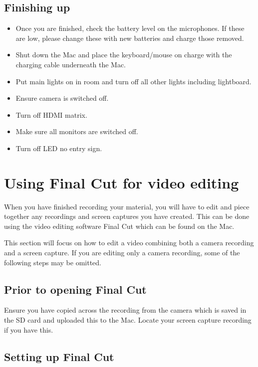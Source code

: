 \documentclass[
]{book}
\begin{document}
\hypertarget{finishing-up}{%
\section{Finishing up}\label{finishing-up}}

\begin{itemize}
\item
  Once you are finished, check the battery level on the microphones. If these are low, please change these with new batteries and charge those removed.
\item
  Shut down the Mac and place the keyboard/mouse on charge with the charging cable underneath the Mac.
\item
  Put main lights on in room and turn off all other lights including lightboard.
\item
  Ensure camera is switched off.
\item
  Turn off HDMI matrix.
\item
  Make sure all monitors are switched off.
\item
  Turn off LED no entry sign.
\end{itemize}

\hypertarget{using-final-cut-for-video-editing}{%
\chapter{Using Final Cut for video editing}\label{using-final-cut-for-video-editing}}

When you have finished recording your material, you will have to edit and piece together any recordings and screen captures you have created. This can be done using the video editing software Final Cut which can be found on the Mac.

This section will focus on how to edit a video combining both a camera recording and a screen capture. If you are editing only a camera recording, some of the following steps may be omitted.

\hypertarget{prior-to-opening-final-cut}{%
\section{Prior to opening Final Cut}\label{prior-to-opening-final-cut}}

Ensure you have copied across the recording from the camera which is saved in the SD card and uploaded this to the Mac. Locate your screen capture recording if you have this.

\hypertarget{setting-up-final-cut}{%
\section{Setting up Final Cut}\label{setting-up-final-cut}}
\end{document}

